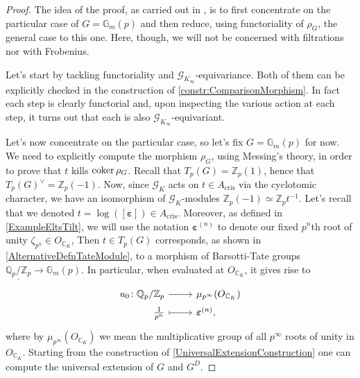 \begin{proof}
	The idea of the proof, as carried out in \cite[\S6]{Faltings},
	is to first concentrate on the particular case of $G = \mathbb{G}_m(p)$
	and then reduce, using functoriality of $\rho_G$, the general case to this one.
	Here, though, we will not be concerned with filtrations nor with Frobenius.

	Let's start by tackling functoriality and $\mathscr{G}_{K_\infty}$-equivariance.
	Both of them can be explicitly checked in the construction of 
	\cref{constr:ComparisonMorphism}.
	In fact each step is clearly functorial
	and, upon inspecting the various action at each step, it turns out
	that each is also $\mathscr{G}_{K_\infty}$-equivariant.

	Let's now concentrate on the particular case, so let's fix $G = \mathbb{G}_m(p)$ for now.
	We need to explicitly compute the morphism $\rho_G$, using Messing's theory,
	in order to prove that $t$ kills $\operatorname{coker} \rho_G$.
	Recall that $T_p(G) = \mathbb{Z}_{p}(1)$, hence that $T_p(G)^\vee = \mathbb{Z}_{p}(-1)$.
	Now, since $\mathscr{G}_{K}$ acts on $t \in A_{\mathrm{cris}}$ via the cyclotomic
	character, we have an isomorphism of $\mathscr{G}_{K}$-modules $\mathbb{Z}_{p}(-1)
	\simeq \mathbb{Z}_{p} t^{-1}$.
	Let's recall that we denoted $t = \log([\boldsymbol\varepsilon]) \in A_{\mathrm{cris}}$.
	Moreover, as defined in \cref{ExampleEltsTilt}, we will use
	the notation $\boldsymbol\varepsilon^{(n)}$ to denote
	our fixed $p^n$th root of unity $\zeta_{p^n} \in O_{\mathbb{C}_K}$,
	Then $t \in T_p(G)$ corresponds, as shown in \cref{AlternativeDefnTateModule},
	to a morphism of Barsotti-Tate groups $\underline{\mathbb{Q}_p/\mathbb{Z}_{p}} \to \mathbb{G}_m(p)$.
	In particular, when evaluated at $O_{\mathbb{C}_K}$, it gives rise to
	\begin{equation*}
	\begin{tikzcd}[row sep = 0ex
		,/tikz/column 1/.append style={anchor=base east}
		,/tikz/column 2/.append style={anchor=base west}]
		u_0\colon 
		\mathbb{Q}_p/\mathbb{Z}_{p}
		\arrow[r, "", rightarrow] &
		\mu_{p^\infty}(O_{\mathbb{C}_K}) \\
		\frac{ 1 }{ p^n } \arrow[r, "", mapsto] & 
		\boldsymbol\varepsilon^{(n)}
	,\end{tikzcd}
	\end{equation*} 
	where by $\mu_{p^\infty}(O_{\mathbb{C}_K})$ we mean the multiplicative group
	of all $p^\infty$ roots of unity in $O_{\mathbb{C}_K}$.
	Starting from the construction of \cref{UniversalExtensionConstruction} 
	one can compute the universal extension of $G$ and $G^D$.

\end{proof}

